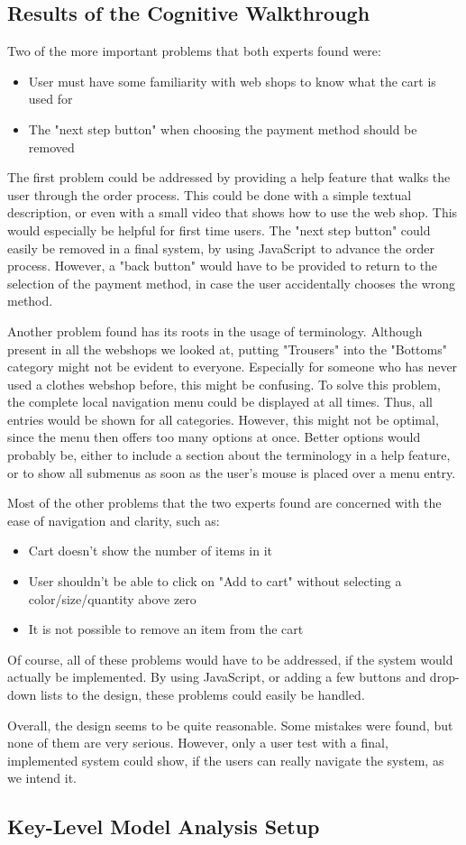 \subsection{Results of the Cognitive Walkthrough}
Two of the more important problems that both experts found were:
\begin{itemize}\addtolength{\itemsep}{-0.5\baselineskip}
	\item User must have some familiarity with web shops to know what the cart is used for
	\item The "next step button" when choosing the payment method should be removed
\end{itemize}
The first problem could be addressed by providing a help feature that walks the user through the order process. This could be done with a simple textual description, or even with a small video that shows how to use the web shop. This would especially be helpful for first time users.
The "next step button" could easily be removed in a final system, by using JavaScript to advance the order process. However, a "back button" would have to be provided to return to the selection of the payment method, in case the user accidentally chooses the wrong method.

Another problem found has its roots in the usage of terminology. Although present in all the webshops we looked at, putting "Trousers" into the "Bottoms" category might not be evident to everyone. Especially for someone who has never used a clothes webshop before, this might be confusing. To solve this problem, the complete local navigation menu could be displayed at all times. Thus, all entries would be shown for all categories. However, this might not be optimal, since the menu then offers too many options at once. Better options would probably be, either to include a section about the terminology in a help feature, or to show all submenus as soon as the user's mouse is placed over a menu entry.

Most of the other problems that the two experts found are concerned with the ease of navigation and clarity, such as:
\begin{itemize}\addtolength{\itemsep}{-0.5\baselineskip}
	\item Cart doesn't show the number of items in it
	\item User shouldn't be able to click on "Add to cart" without selecting a color/size/quantity above zero
	\item It is not possible to remove an item from the cart
\end{itemize}
Of course, all of these problems would have to be addressed, if the system would actually be implemented. By using JavaScript, or adding a few buttons and drop-down lists to the design, these problems could easily be handled.

Overall, the design seems to be quite reasonable. Some mistakes were found, but none of them are very serious. However, only a user test with a final, implemented system could show, if the users can really navigate the system, as we intend it.

\subsection{Key-Level Model Analysis Setup}